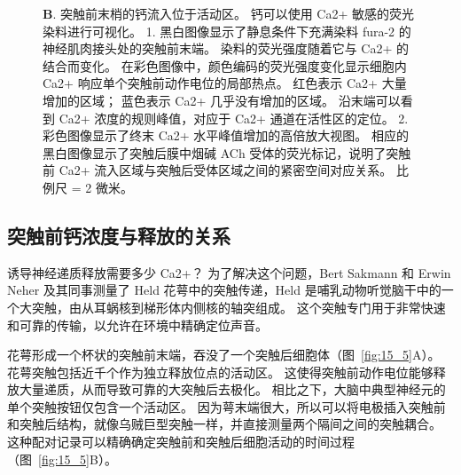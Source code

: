 \begin{figure}[htbp]
{	\textbf{B}. 突触前末梢的钙流入位于活动区。
	钙可以使用 Ca2+ 敏感的荧光染料进行可视化。
	1. 黑白图像显示了静息条件下充满染料 fura-2 的神经肌肉接头处的突触前末端。
	染料的荧光强度随着它与 Ca2+ 的结合而变化。
	在彩色图像中，颜色编码的荧光强度变化显示细胞内 Ca2+ 响应单个突触前动作电位的局部热点。
	红色表示 Ca2+ 大量增加的区域；
	蓝色表示 Ca2+ 几乎没有增加的区域。
	沿末端可以看到 Ca2+ 浓度的规则峰值，对应于 Ca2+ 通道在活性区的定位。
	2. 彩色图像显示了终末 Ca2+ 水平峰值增加的高倍放大视图。
	相应的黑白图像显示了突触后膜中烟碱 ACh 受体的荧光标记，说明了突触前 Ca2+ 流入区域与突触后受体区域之间的紧密空间对应关系\cite{wachman2004spatial}。
	比例尺 = 2 微米。}
	\label{fig:15_4}
\end{figure}



\subsection{突触前钙浓度与释放的关系}

诱导神经递质释放需要多少 Ca2+？ 
为了解决这个问题，Bert Sakmann 和 Erwin Neher 及其同事测量了 Held 花萼中的突触传递，Held 是哺乳动物听觉脑干中的一个大突触，由从耳蜗核到梯形体内侧核的轴突组成。
这个突触专门用于非常快速和可靠的传输，以允许在环境中精确定位声音。


花萼形成一个杯状的突触前末端，吞没了一个突触后细胞体（图~\ref{fig:15_5}A）。
花萼突触包括近千个作为独立释放位点的活动区。
这使得突触前动作电位能够释放大量递质，从而导致可靠的大突触后去极化。
相比之下，大脑中典型神经元的单个突触按钮仅包含一个活动区。
因为萼末端很大，所以可以将电极插入突触前和突触后结构，就像乌贼巨型突触一样，并直接测量两个隔间之间的突触耦合。
这种配对记录可以精确确定突触前和突触后细胞活动的时间过程（图~\ref{fig:15_5}B）。


